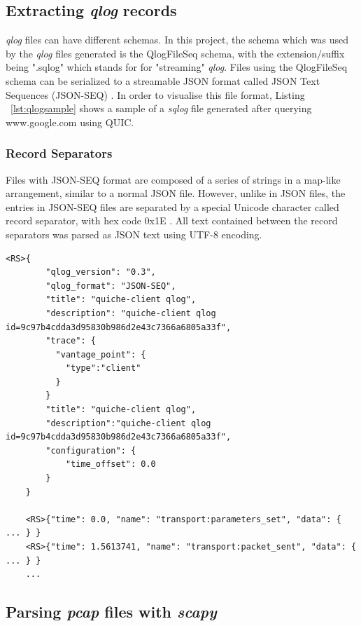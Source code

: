 \documentclass{l4proj}
\begin{document}
\subsection{Extracting \emph{qlog} records}

\emph{qlog} files can have different schemas. In this project, the schema which was used by the \emph{qlog} files generated is the QlogFileSeq schema, with the extension/suffix being ".sqlog" which stands for for "streaming" \emph{qlog}. Files using the QlogFileSeq schema can be serialized to a streamable JSON format called JSON Text Sequences (JSON-SEQ) \citep{Will2015}. In order to visualise this file format, Listing ~\ref{lst:qlogsample} shows a sample of a \emph{sqlog} file generated after querying www.google.com using QUIC.

\subsubsection{Record Separators} Files with JSON-SEQ format are composed of a series of strings in a map-like arrangement, similar to a normal JSON file. However, unlike in JSON files, the entries in JSON-SEQ files are separated by a special Unicode character called record separator, with hex code 0x1E \citep{Will2015}. All text contained between the record separators was parsed as JSON text using UTF-8 encoding.

\begin{lstlisting}[caption={Sample \emph{sqlog} file format extracted from the generated file for the QUIC connection to \emph{www.google.com} from Location 1. For display purposes, the record separators are shown as <RS>.}, float, label=lst:qlogsample]
    <RS>{
        "qlog_version": "0.3",
        "qlog_format": "JSON-SEQ",
        "title": "quiche-client qlog",
        "description": "quiche-client qlog id=9c97b4cdda3d95830b986d2e43c7366a6805a33f",
        "trace": {
          "vantage_point": {
            "type":"client"
          }
        }
        "title": "quiche-client qlog",
        "description":"quiche-client qlog id=9c97b4cdda3d95830b986d2e43c7366a6805a33f",
        "configuration": {
            "time_offset": 0.0
        }
    }
        
    <RS>{"time": 0.0, "name": "transport:parameters_set", "data": { ... } }
    <RS>{"time": 1.5613741, "name": "transport:packet_sent", "data": { ... } }
    ...
\end{lstlisting}


\subsection{Parsing \emph{pcap} files with \emph{scapy}} 
\end{document}
